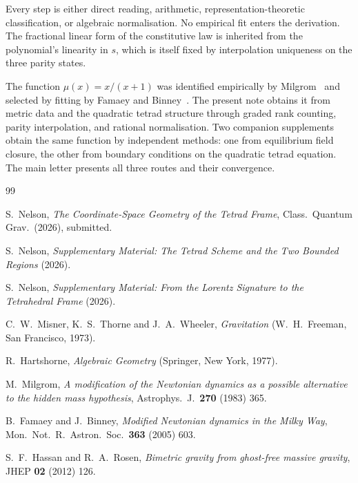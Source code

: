 \documentclass[twocolumn]{iopjournal}
\begin{document}
\vspace{6pt}
Every step is either direct reading, arithmetic,
representation-theoretic classification, or algebraic
normalisation. No empirical fit enters the derivation. The
fractional linear form of the constitutive law is inherited
from the polynomial's linearity in $s$, which is itself fixed
by interpolation uniqueness on the three parity states.

The function $\mu(x) = x/(x+1)$ was identified empirically by
Milgrom~\cite{Milgrom1983} and selected by fitting by
Famaey and Binney~\cite{FamaeyBinney2005}. The present note
obtains it from metric data and the quadratic tetrad structure
through graded rank counting, parity interpolation, and rational
normalisation. Two companion supplements obtain the same
function by independent methods: one from equilibrium field
closure, the other from boundary conditions on the quadratic
tetrad equation. The main letter presents all three routes and
their convergence.


\begin{thebibliography}{99}

S.~Nelson,
\textit{The Coordinate-Space Geometry of the Tetrad Frame},
Class.\ Quantum Grav.\ (2026), submitted.

S.~Nelson,
\textit{Supplementary Material: The Tetrad Scheme and the Two
Bounded Regions} (2026).

S.~Nelson,
\textit{Supplementary Material: From the Lorentz Signature to the
Tetrahedral Frame} (2026).

C.~W.~Misner, K.~S.~Thorne and J.~A.~Wheeler,
\textit{Gravitation}
(W.~H.~Freeman, San Francisco, 1973).

R.~Hartshorne,
\textit{Algebraic Geometry}
(Springer, New York, 1977).

M.~Milgrom,
\textit{A modification of the Newtonian dynamics as a possible
alternative to the hidden mass hypothesis},
Astrophys.\ J.\ \textbf{270} (1983) 365.

B.~Famaey and J.~Binney,
\textit{Modified Newtonian dynamics in the Milky Way},
Mon.\ Not.\ R.\ Astron.\ Soc.\ \textbf{363} (2005) 603.

S.~F.~Hassan and R.~A.~Rosen,
\textit{Bimetric gravity from ghost-free massive gravity},
JHEP \textbf{02} (2012) 126.

\end{thebibliography}
\end{document}
